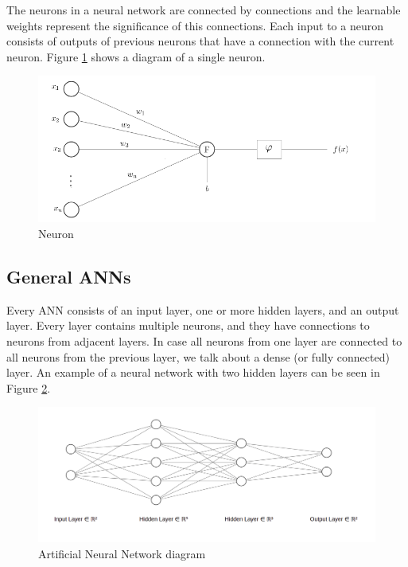 The neurons in a neural network are connected by connections and the learnable weights represent the significance of this connections. Each input to a neuron consists of outputs of previous neurons that have a connection with the current neuron. Figure \ref{fig:neuron} shows a diagram of a single neuron.

\begin{figure}[h!]
    \centering
    \includegraphics[scale=0.4]{figures/neuron.png}
    \caption{Neuron} 
    \label{fig:neuron}
\end{figure}

\subsection{General ANNs}\label{tb:ann}
Every ANN consists of an input layer, one or more hidden layers, and an output layer. Every layer contains multiple neurons, and they have connections to neurons from adjacent layers. In case all neurons from one layer are connected to all neurons from the previous layer, we talk about a dense (or fully connected) layer. An example of a neural network with two hidden layers can be seen in Figure \ref{fig:simple_ann}.

\begin{figure}[h!]
    \centering
    \includegraphics[scale=0.2]{figures/simple_nn.png}
    \caption{Artificial Neural Network diagram} 
    \label{fig:simple_ann}
\end{figure}

